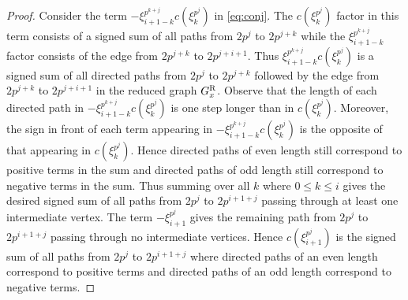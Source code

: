 \documentclass{amsart}
\theoremstyle{definition}
\theoremstyle{plain}
\numberwithin{theorem}{section}
\numberwithin{equation}{section}
\numberwithin{figure}{section}
\newcommand{\0}{\langle 0 \rangle }
\begin{document}
\begin{proof}
Consider the term $- \xi_{i + 1 - k}^{p^{k + j}} c(\xi_k^{p^j})$ in \cref{eq:conj}. The $c(\xi_k^{p^j})$ factor in this term consists of a signed sum of all paths from $2 p^j$ to $2 p^{j + k}$ while the $\xi_{i + 1 - k}^{p^{k + j}}$ factor consists of the edge from $2 p^{j + k}$ to $2 p^{j + i +1}$. Thus $\xi_{i + 1 - k}^{p^{k + j}} c(\xi_k^{p^j})$ is a signed sum of all directed paths from $2 p^j$ to $2 p^{j + k}$ followed by the edge from $2 p^{j + k}$ to $2 p^{j + i +1}$ in the reduced graph $G_x^\textup{R}$. Observe that the length of each directed path in $-\xi_{i + 1 - k}^{p^{k + j}} c(\xi_k^{p^j})$ is one step longer than in $c(\xi_k^{p^j})$. Moreover, the sign in front of each term appearing in $-\xi_{i + 1 - k}^{p^{k + j}} c(\xi_k^{p^j})$ is the opposite of that appearing in $c(\xi_k^{p^j})$. Hence directed paths of even length still correspond to positive terms in the sum and directed paths of odd length still correspond to negative terms in the sum.
Thus summing over all $k$ where $0 \leq k \leq i$ gives the desired signed sum of all paths from $2 p^j$ to $2 p^{i + 1 + j}$ passing through at least one intermediate vertex. The term $-\xi_{i + 1}^{p^j}$ gives the remaining path from $2 p^j$ to $2 p^{i + 1 +j}$ passing through no intermediate vertices. Hence $c(\xi_{i + 1}^{p^j})$ is the signed sum of all paths from $2p^j$ to $2 p^{i + 1 + j}$ where directed paths of an even length correspond to positive terms and directed paths of an odd length correspond to negative terms. 


\end{proof}
\end{document}
